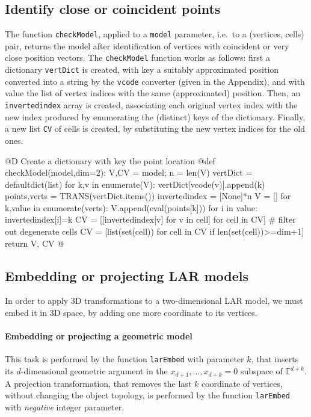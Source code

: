 \documentclass[11pt,oneside]{article}	%
\def\E{\mathbb{E}}
\begin{document}
\subsection{Identify close or coincident points}

The function \texttt{checkModel}, applied to a \texttt{model} parameter, i.e.~to a (vertices, cells)  pair, returns the model after identification of vertices with coincident or very close position vectors.
The \texttt{checkModel} function works as follows: first a dictionary \texttt{vertDict} is created, with key a suitably approximated position converted into a string by the \texttt{vcode} converter (given in the Appendix), and with value the list of vertex indices with the same (approximated) position. Then, an \texttt{invertedindex} array is created, associating each original vertex index with the new index produced by enumerating the (distinct) keys of the dictionary. Finally, a new list \texttt{CV} of cells is created, by substituting the new vertex indices for the old ones. 

@D Create a dictionary with key the point location
@{def checkModel(model,dim=2):
	V,CV = model; n = len(V)
	vertDict = defaultdict(list)
	for k,v in enumerate(V): vertDict[vcode(v)].append(k) 
	points,verts = TRANS(vertDict.items())
	invertedindex = [None]*n
	V = []
	for k,value in enumerate(verts):
		V.append(eval(points[k]))
		for i in value:
			invertedindex[i]=k	
	CV = [[invertedindex[v] for v in cell] for cell in CV]
	# filter out degenerate cells
	CV = [list(set(cell)) for cell in CV if len(set(cell))>=dim+1]
	return V, CV
@}

\subsection{Embedding or projecting LAR models}

In order to apply 3D transformations to a two-dimensional LAR model, we must embed it in 3D space, by adding one more coordinate to its vertices. 

\paragraph{Embedding or projecting a geometric model}

This task is performed by the function \texttt{larEmbed} with parameter $k$, that inserts its $d$-dimensional geometric argument in the $x_{d+1}, \ldots, x_{d+k}=0$ subspace of $\E^{d+k}$.
A projection transformation, that removes the last $k$ coordinate of vertices, without changing the object topology, is performed by the function \texttt{larEmbed} with \emph{negative} integer parameter.
\end{document}
